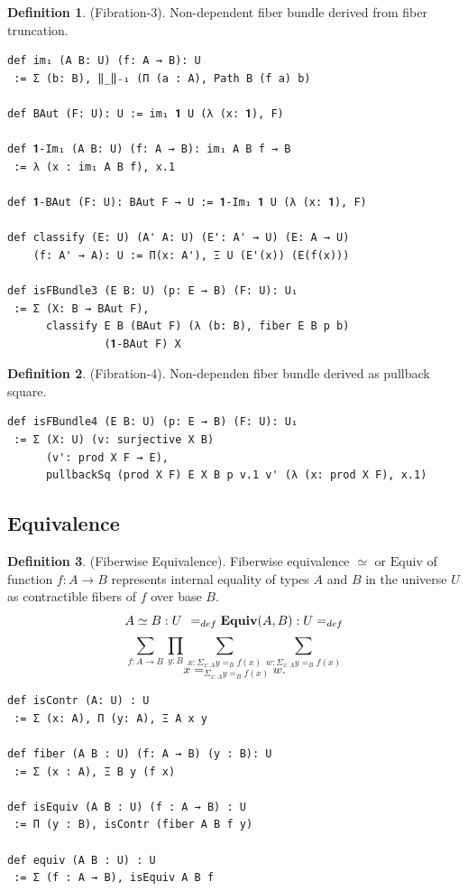 \documentclass{article}
\theoremstyle{definition}
\newtheorem{definition}{Definition}
\begin{document}
\begin{definition} (Fibration-3). Non-dependent fiber bundle derived from fiber truncation.
\begin{lstlisting}[mathescape=true]
def im₁ (A B: U) (f: A → B): U
 := Σ (b: B), ‖_‖₋₁ (Π (a : A), Path B (f a) b)

def BAut (F: U): U := im₁ 𝟏 U (λ (x: 𝟏), F)

def 𝟏-Im₁ (A B: U) (f: A → B): im₁ A B f → B
 := λ (x : im₁ A B f), x.1

def 𝟏-BAut (F: U): BAut F → U := 𝟏-Im₁ 𝟏 U (λ (x: 𝟏), F)

def classify (E: U) (A' A: U) (E': A' → U) (E: A → U)
    (f: A' → A): U := Π(x: A'), Ξ U (E'(x)) (E(f(x)))

def isFBundle3 (E B: U) (p: E → B) (F: U): U₁
 := Σ (X: B → BAut F),
      classify E B (BAut F) (λ (b: B), fiber E B p b)
               (𝟏-BAut F) X
\end{lstlisting}
\end{definition}

\begin{definition} (Fibration-4). Non-dependen fiber bundle derived as pullback square.
\begin{lstlisting}
def isFBundle4 (E B: U) (p: E → B) (F: U): U₁
 := Σ (X: U) (v: surjective X B)
      (v': prod X F → E),
      pullbackSq (prod X F) E X B p v.1 v' (λ (x: prod X F), x.1)
\end{lstlisting}
\end{definition}



\newpage
\subsection{Equivalence}

\begin{definition} (Fiberwise Equivalence).
Fiberwise equivalence $\simeq$ or $\mathrm{Equiv}$
of function $f: A \rightarrow B$
represents internal equality of types $A$ and $B$
in the universe $U$ as contractible fibers of $f$
over base $B$.
$$
A\simeq B : U\hspace{.4em}=_{def}\mathbf{Equiv}(A,B) : U =_{def}
$$
$$
\sum_{f: A \rightarrow B}
\prod_{y:B}
\sum_{x: \Sigma_{x:A} y =_B f(x)}
\sum_{w: \Sigma_{x:A} y =_B f(x)}
$$
$$
  x =_{\Sigma_{x:A} y =_B f(x)} w.
$$
\begin{lstlisting}
def isContr (A: U) : U
 := Σ (x: A), Π (y: A), Ξ A x y

def fiber (A B : U) (f: A → B) (y : B): U
 := Σ (x : A), Ξ B y (f x)

def isEquiv (A B : U) (f : A → B) : U
 := Π (y : B), isContr (fiber A B f y)

def equiv (A B : U) : U
 := Σ (f : A → B), isEquiv A B f
\end{lstlisting}
\end{definition}
\end{document}
